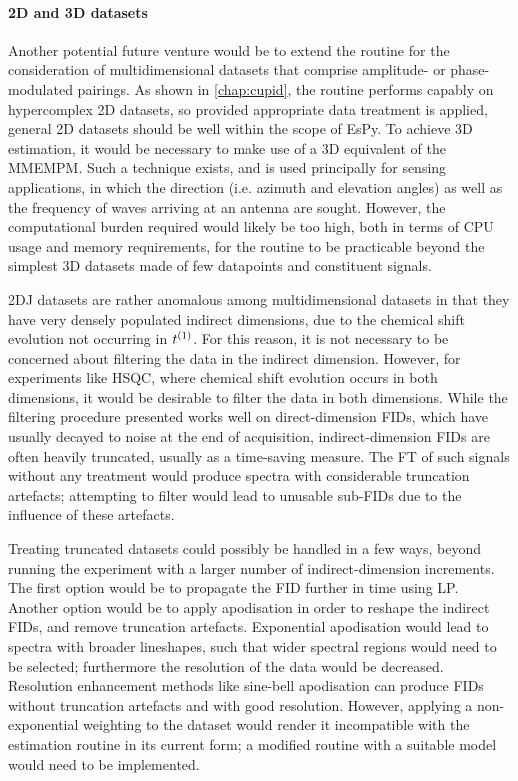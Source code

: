 \paragraph{\ac{2D} and \ac{3D} datasets}
Another potential future venture would be to extend the routine for the
consideration of multidimensional datasets that comprise amplitude- or
phase-modulated pairings.
As shown in \cref{chap:cupid}, the routine performs capably on
hypercomplex \ac{2D} datasets, so provided appropriate data treatment is
applied, general \ac{2D} datasets should be well within the scope of
\ac{EsPy}.
To achieve \ac{3D} estimation, it would be necessary to
make use of a \ac{3D} equivalent of the \ac{MMEMPM}. Such a technique exists,
and is used principally for sensing applications, in which the direction (i.e.
azimuth and elevation angles) as well as the frequency of waves arriving at an
antenna are sought\cite{Yilmazer2006}.
However, the computational burden required would likely be too high, both
in terms of \ac{CPU} usage and memory requirements, for the routine to be
practicable beyond the simplest \ac{3D} datasets made of few datapoints and
constituent signals.

\ac{2DJ} datasets are rather anomalous among multidimensional datasets in
that they have very densely populated indirect dimensions, due to the chemical
shift evolution not occurring in $t^{(1)}$. For this reason, it
is not necessary to be concerned about filtering the data in the indirect
dimension. However, for experiments like \ac{HSQC}, where chemical shift
evolution occurs in both dimensions, it would be desirable to filter
the data in both dimensions.
While the filtering procedure presented works well on direct-dimension
\acp{FID}, which have usually decayed to noise at the end
of acquisition, indirect-dimension \acp{FID} are often heavily truncated,
usually as a time-saving measure. The \ac{FT} of such signals without any
treatment would produce spectra with considerable truncation artefacts;
attempting to filter would lead to unusable sub-\acp{FID} due to the influence
of these artefacts.

Treating truncated datasets could possibly be handled in a few ways,
beyond running the experiment with a larger number of indirect-dimension
increments. The first option would be to propagate the \ac{FID} further in time
using \ac{LP}. Another option would be to apply apodisation in order to reshape
the indirect \acp{FID}, and remove truncation artefacts.
Exponential apodisation would lead to spectra with broader lineshapes, such
that wider spectral regions would need to be selected; furthermore the
resolution of the data would be decreased.
Resolution enhancement methods like sine-bell apodisation can
produce \acp{FID} without truncation artefacts and with good resolution.
However, applying a non-exponential weighting to the
dataset would render it incompatible with the estimation routine in its
current form; a modified routine with a suitable model would need to
be implemented.

